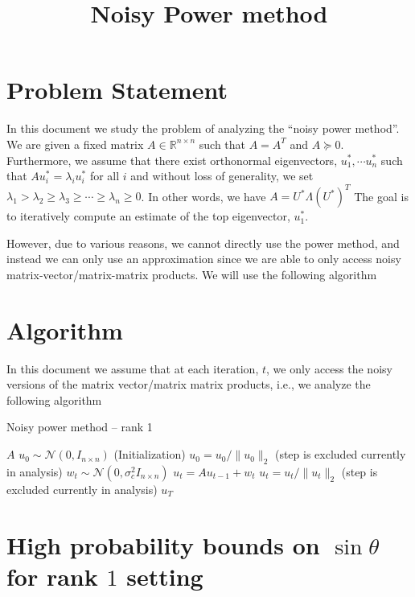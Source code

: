 \documentclass[10pt]{article}
\title{\textbf{Noisy Power method}}
\author{}
\date{}
\newcommand{\R}{\mathbb{R}}
\begin{document}
\maketitle


\section{Problem Statement}
In this document we study the problem of analyzing the ``noisy power method''. We are given a fixed matrix $A \in \R^{n \times n}$ such that $A = A^T$ and $A \succeq 0$. Furthermore, we assume that there exist orthonormal eigenvectors, $u_1^*, \cdots u_n^*$ such that $A u_i^* = \lambda_i u_i^*$ for all $i$ and without loss of generality, we set $\lambda_1 > \lambda_2 \geq \lambda_3 \geq \cdots \geq \lambda_n \geq 0$. In other words, we have $A = U^* \Lambda (U^*)^T$ The goal is to iteratively compute an estimate of the top eigenvector, $u_1^*$. 

However, due to various reasons, we cannot directly use the power method, and instead we can only use an approximation since we are able to only access noisy matrix-vector/matrix-matrix  products. We will use the following algorithm

\section{Algorithm}
In this document we assume that at each iteration, $t$, we only access the noisy versions of the matrix vector/matrix matrix products, i.e., we analyze the following algorithm

\newcommand{\Y}{\bm{Y}}
\newcommand{\z}{\bm{z}}
\begin{algorithm}[H]
\caption{Noisy power method -- rank 1}\label{algo:rank1}
  \begin{algorithmic}[1]
    \REQUIRE $A$ 
    \STATE $u_0 \sim \mathcal{N}(0, I_{n\times n})$ (Initialization) 
    \STATE $u_0 = u_0/\|u_0\|_2$ (step is excluded currently in analysis)
    \STATE $w_t \sim \mathcal{N}(0, \sigma_c^2 I_{n\times n})$
    \STATE $u_t = A u_{t-1} + w_t$ 
    \STATE $u_t = u_t / \|u_t\|_2$ (step is excluded currently in analysis)
    \ENDFOR
    \ENSURE $u_T$ 
  \end{algorithmic}
\end{algorithm}

\newcommand{\E}{\mathbb{E}}
\section{High probability bounds on $\sin\theta$ for rank $1$ setting}
\end{document}
